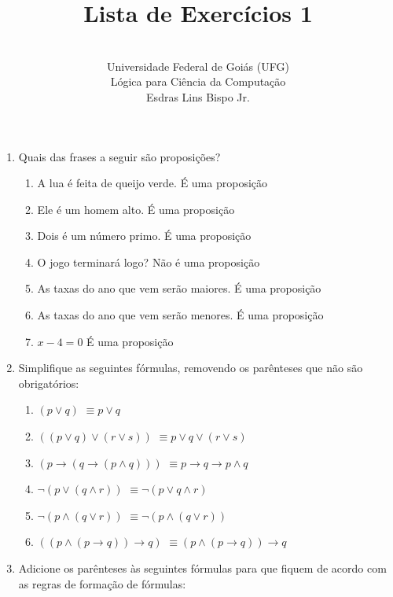 \documentclass[12pt,a4paper,oneside]{article}
\author{\\Universidade Federal de Goiás (UFG) \\Lógica para Ciência da Computação \\Esdras Lins Bispo Jr.}
\title{\sc \huge Lista de Exercícios 1}
\begin{document}
\maketitle

\begin{enumerate}

	\item Quais das frases a seguir são proposições?

		\begin{enumerate}
			\item A lua é feita de queijo verde. {\color{verde} É uma proposição}
			\item Ele é um homem alto. {\color{verde} É uma proposição}
			\item Dois é um número primo. {\color{verde} É uma proposição}
			\item O jogo terminará logo? {\color{red} Não é uma proposição}
			\item As taxas do ano que vem serão maiores. {\color{verde} É uma proposição}
			\item As taxas do ano que vem serão menores. {\color{verde} É uma proposição}
			\item $x - 4 = 0$ {\color{verde} É uma proposição}
		\end{enumerate}
	
	\item Simplifique as seguintes fórmulas, removendo os parênteses que não são obrigatórios:

		\begin{enumerate}
			\item $(p \vee q)$ {\color{verde} $\equiv p \vee q$}
			\item $((p \vee q) \vee (r \vee s))$ {\color{verde} $\equiv p \vee q \vee (r \vee s)$}
			\item $(p \rightarrow (q \rightarrow (p \wedge q)))$ 
			      {\color{verde} $\equiv p \rightarrow q \rightarrow p \wedge q$}
			\item $\neg (p \vee (q \wedge r))$ {\color{verde} $\equiv \neg (p \vee q \wedge r)$}
			\item $\neg (p \wedge (q \vee r))$ {\color{verde} $\equiv \neg (p \wedge (q \vee r))$}
			\item $((p \wedge (p \rightarrow q)) \rightarrow q)$ 
			      {\color{verde} $\equiv (p \wedge (p \rightarrow q)) \rightarrow q$}
		\end{enumerate}
		
	\item Adicione os parênteses às seguintes fórmulas para que fiquem de acordo com as regras de formação de fórmulas:
	

\end{enumerate}
\end{document}
